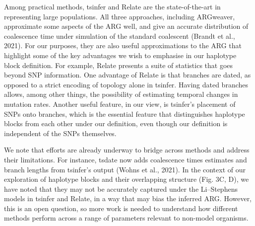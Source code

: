 \documentclass[twocolumn]{bmcart}%
\begin{document}
\begin{tcolorbox}[colback=blue!5!white,colframe=blue!50!black,title= Box 3: Application and limits of Li and Stephens Model ]
\begin{center}
\end{center}
\end{tcolorbox}


Among practical methods, tsinfer and Relate are the state-of-the-art in representing large populations. All three approaches, including ARGweaver, approximate some aspects of the ARG well, and give an accurate distribution of coalescence time under simulation of the standard coalescent (Brandt et al., 2021). For our purposes, they are also useful approximations to the ARG that highlight some of the key advantages we wish to emphasise in our haplotype block definition. For example, Relate presents a suite of statistics that goes beyond SNP information. One advantage of Relate is that branches are dated, as opposed to a strict encoding of topology alone in tsinfer. Having dated branches allows, among other things, the possibility of estimating temporal changes in mutation rates. Another useful feature, in our view, is tsinfer’s placement of SNPs onto branches, which is the essential feature that distinguishes haplotype blocks from each other under our definition, even though our definition is independent of the SNPs themselves.

We note that efforts are already underway to bridge across methods and address their limitations. For instance, tsdate now adds coalescence times estimates and branch lengths from tsinfer’s output (Wohns et al., 2021). In the context of our exploration of haplotype blocks and their overlapping structure (Fig. 3C, D), we have noted that they may not be accurately captured under the Li–Stephens models in tsinfer and Relate, in a way that may bias the inferred ARG. However, this is an open question, so more work is needed to understand how different methods perform across a range of parameters relevant to non-model organisms.
\end{document}
